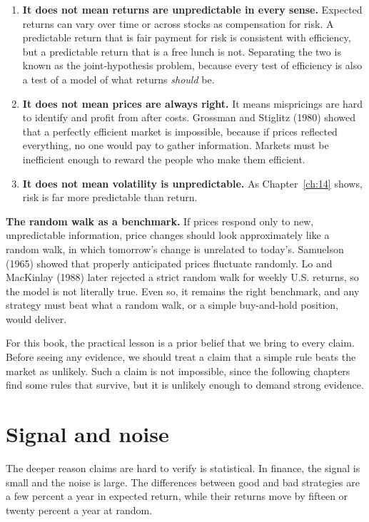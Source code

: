 \begin{enumerate}
  \item \textbf{It does not mean returns are unpredictable in every sense.} Expected returns can vary over time or across stocks as compensation for risk. A predictable return that is fair payment for risk is consistent with efficiency, but a predictable return that is a free lunch is not. Separating the two is known as the joint-hypothesis problem, because every test of efficiency is also a test of a model of what returns \emph{should} be.
  \item \textbf{It does not mean prices are always right.} It means mispricings are hard to identify and profit from after costs. Grossman and Stiglitz (1980) showed that a perfectly efficient market is impossible, because if prices reflected everything, no one would pay to gather information. Markets must be inefficient enough to reward the people who make them efficient.
  \item \textbf{It does not mean volatility is unpredictable.} As Chapter~\ref{ch:14} shows, risk is far more predictable than return.
\end{enumerate}

\textbf{The random walk as a benchmark.} If prices respond only to new, unpredictable information, price changes should look approximately like a random walk, in which tomorrow's change is unrelated to today's. Samuelson (1965) showed that properly anticipated prices fluctuate randomly. Lo and MacKinlay (1988) later rejected a strict random walk for weekly U.S. returns, so the model is not literally true. Even so, it remains the right benchmark, and any strategy must beat what a random walk, or a simple buy-and-hold position, would deliver.

For this book, the practical lesson is a prior belief that we bring to every claim. Before seeing any evidence, we should treat a claim that a simple rule beats the market as unlikely. Such a claim is not impossible, since the following chapters find some rules that survive, but it is unlikely enough to demand strong evidence.

\section{Signal and noise}
\label{sec:01-signal-noise}

The deeper reason claims are hard to verify is statistical. In finance, the signal is small and the noise is large. The differences between good and bad strategies are a few percent a year in expected return, while their returns move by fifteen or twenty percent a year at random.

